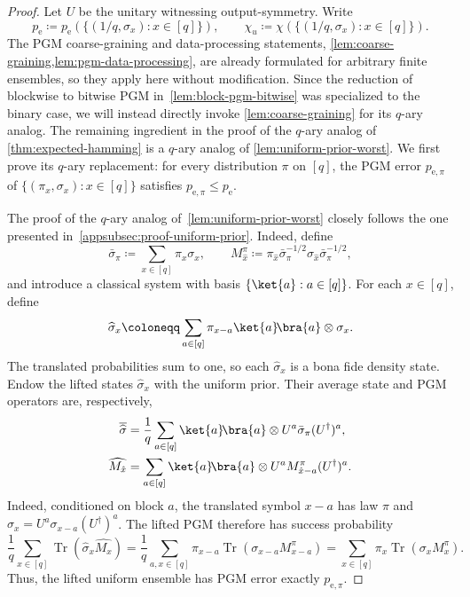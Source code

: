 \documentclass[11pt]{article}
\renewcommand{\leq}{\leqslant}
\theoremstyle{remark}
\newcommand{\ketbra}[2]{\ket{#1}\!\bra{#2}}
\newcommand{\Tr}{\operatorname{Tr}}
\begin{document}
\begin{proof}
Let $U$ be the unitary witnessing output-symmetry. Write
\begin{equation*}
p_{\mathrm{e}} \coloneqq p_{\mathrm{e}}\left(\{(1/q,\sigma_x) : x \in [q]\}\right),
\qquad
\chi_u \coloneqq \chi\left(\{(1/q,\sigma_x) : x \in [q]\}\right).
\end{equation*}
The PGM coarse-graining and data-processing statements, \cref{lem:coarse-graining,lem:pgm-data-processing}, are already formulated for arbitrary finite ensembles, so they apply here without modification. Since the reduction of blockwise to bitwise PGM in~\cref{lem:block-pgm-bitwise} was specialized to the binary case, we will instead directly invoke \cref{lem:coarse-graining} for its $q$-ary analog. The remaining ingredient in the proof of the $q$-ary analog of \cref{thm:expected-hamming} is a $q$-ary analog of \cref{lem:uniform-prior-worst}. We first prove its $q$-ary replacement: for every distribution $\pi$ on $[q]$, the PGM error $p_{\mathrm{e},\pi}$ of $\{(\pi_x,\sigma_x) : x \in [q]\}$ satisfies $p_{\mathrm{e},\pi} \leq p_{\mathrm{e}}$.

The proof of the $q$-ary analog of~\cref{lem:uniform-prior-worst} closely follows the one presented in~\cref{appsubsec:proof-uniform-prior}. Indeed, define
\begin{equation*}
\bar{\sigma}_\pi \coloneqq \sum_{x \in [q]}{\pi_x\sigma_x},
\qquad
M_{\hat{x}}^\pi \coloneqq \pi_{\hat{x}}\bar{\sigma}_\pi^{-1/2}\sigma_{\hat{x}}\bar{\sigma}_\pi^{-1/2},
\end{equation*}
and introduce a classical system with basis $\{\ket{a} : a \in [q]\}$. For each $x \in [q]$, define
\begin{equation*}
\widehat{\sigma}_x
\coloneqq
\sum_{a \in [q]}
\pi_{x-a}\ketbra{a}{a} \otimes \sigma_x.
\end{equation*}
The translated probabilities sum to one, so each $\widehat{\sigma}_x$ is a bona fide density state. Endow the lifted states $\widehat{\sigma}_x$ with the uniform prior. Their average state and PGM operators are, respectively,
\begin{align*}
\overline{\widehat{\sigma}}
&=\frac{1}{q}\sum_{a \in [q]}{\ketbra{a}{a} \otimes U^a\bar{\sigma}_\pi (U^\dagger)^a}, \\
\widehat{M_{\hat{x}}}
&=\sum_{a \in [q]}{\ketbra{a}{a} \otimes U^aM_{\hat{x}-a}^\pi (U^\dagger)^a}.
\end{align*}
Indeed, conditioned on block $a$, the translated symbol $x-a$ has law $\pi$ and $\sigma_x = U^a\sigma_{x-a}(U^\dagger)^a$. The lifted PGM therefore has success probability
\begin{equation*}
\frac{1}{q}\sum_{x \in [q]}{\Tr(\widehat{\sigma}_x\widehat{M_x})}
=\frac{1}{q}\sum_{a,x \in [q]}{\pi_{x-a}\Tr(\sigma_{x-a}M_{x-a}^\pi)} =\sum_{x \in [q]}{\pi_x\Tr(\sigma_xM_x^\pi)}.
\end{equation*}
Thus, the lifted uniform ensemble has PGM error exactly $p_{\mathrm{e},\pi}$.


\end{proof}
\end{document}
